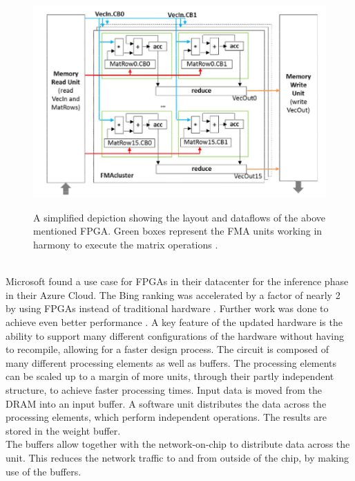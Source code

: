 \documentclass[conference]{IEEEtran}
\begin{document}
	\begin{figure}[h]
		\caption{A simplified depiction showing the layout and dataflows of the above mentioned FPGA. Green boxes represent the FMA units working in harmony to execute the matrix operations \cite{nurvitadhi2016accelerating}.}
		\centering
		\includegraphics[width=\linewidth]{pictures/fpga_operations.png}
		\label{fig:fpgahw}
	\end{figure}
	\\
	Microsoft found a use case for FPGAs in their datacenter for the inference phase in their Azure Cloud. The Bing ranking was accelerated by a factor of nearly 2 by using FPGAs instead of traditional hardware \cite{putnam2014reconfigurable}. Further work was done to achieve even better performance \cite{ovtcharov2015accelerating}. A key feature of the updated hardware is the ability to support many different configurations of the hardware without having to recompile, allowing for a faster design process. The circuit is composed of many different processing elements as well as buffers. The processing elements can be scaled up to a margin of more units, through their partly independent structure, to achieve faster processing times. Input data is moved from the DRAM into an input buffer. A software unit distributes the data across the processing elements, which perform independent operations. The results are stored in the weight buffer.
	\\
	The buffers allow together with the network-on-chip to distribute data across the unit. This reduces the network traffic to and from outside of the chip, by making use of the buffers. 
	\\
	
\end{document}
